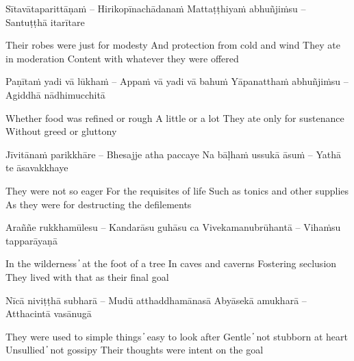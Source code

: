 \begin{twochants}
Sītavātaparittāṇaṁ – Hirikopīnachādanaṁ
Mattaṭṭhiyaṁ abhuñjiṁsu – Santuṭṭhā itarītare
\end{twochants}

\begin{english}
Their robes were just for modesty
And protection from cold and wind
They ate in moderation
Content with whatever they were offered
\end{english}

\begin{twochants}
Paṇītaṁ yadi vā lūkhaṁ – Appaṁ vā yadi vā bahuṁ
Yāpanatthaṁ abhuñjiṁsu – Agiddhā nādhimucchitā
\end{twochants}

\begin{english}
Whether food was refined or rough
A little or a lot
They ate only for sustenance
Without greed or gluttony
\end{english}

\begin{twochants}
Jīvitānaṁ parikkhāre – Bhesajje atha paccaye
Na bāḷhaṁ ussukā āsuṁ – Yathā te āsavakkhaye
\end{twochants}

\begin{english}
They were not so eager
For the requisites of life
Such as tonics and other supplies
As they were for destructing the defilements
\end{english}

\begin{twochants}
Araññe rukkhamūlesu – Kandarāsu guhāsu ca
Vivekamanubrūhantā – Vihaṁsu tapparāyaṇā
\end{twochants}

\begin{english}
In the wilderness  ̓  at the foot of a tree
In caves and caverns
Fostering seclusion
They lived with that as their final goal
\end{english}

\begin{twochants}
Nīcā niviṭṭhā subharā – Mudū atthaddhamānasā
Abyāsekā amukharā – Atthacintā vasānugā
\end{twochants}

\begin{english}
They were used to simple things  ̓  easy to look after
Gentle  ̓  not stubborn at heart
Unsullied  ̓  not gossipy
Their thoughts were intent on the goal
\end{english}

